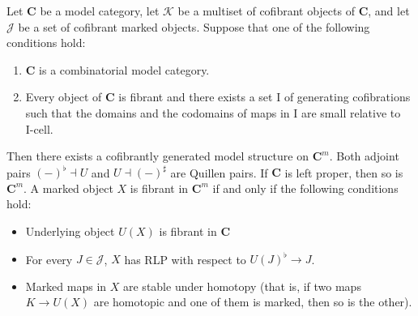 \documentclass[reqno]{amsart}
\theoremstyle{definition}
\theoremstyle{remark}
\newcommand{\cat}[1]{\mathbf{#1}}
\newcommand{\C}{\cat{C}}
\newcommand{\I}{\mathrm{I}}
\newcommand{\class}[2]{#1\text{-}\mathrm{#2}}
\newcommand{\Icell}[1][\I]{\class{#1}{cell}}
\numberwithin{figure}{section}
\begin{document}
\begin{thm}
Let $\C$ be a model category, let $\mathcal{K}$ be a multiset of cofibrant objects of $\C$, and let $\mathcal{J}$ be a set of cofibrant marked objects.
Suppose that one of the following conditions hold:
\begin{enumerate}
\item \label{it:comb} $\C$ is a combinatorial model category.
\item \label{it:all-fib} Every object of $\C$ is fibrant and there exists a set $\I$ of generating cofibrations such that
the domains and the codomains of maps in $\I$ are small relative to $\Icell$.
\end{enumerate}
Then there exists a cofibrantly generated model structure on $\C^m$.
Both adjoint pairs $(-)^\flat \dashv U$ and $U \dashv (-)^\sharp$ are Quillen pairs.
If $\C$ is left proper, then so is $\C^m$.
A marked object $X$ is fibrant in $\C^m$ if and only if the following conditions hold:
\begin{itemize}
\item Underlying object $U(X)$ is fibrant in $\C$
\item For every $J \in \mathcal{J}$, $X$ has RLP with respect to $U(J)^\flat \to J$.
\item Marked maps in $X$ are stable under homotopy (that is, if two maps $K \to U(X)$ are homotopic and one of them is marked, then so is the other).
\end{itemize}
\end{thm}
\end{document}
